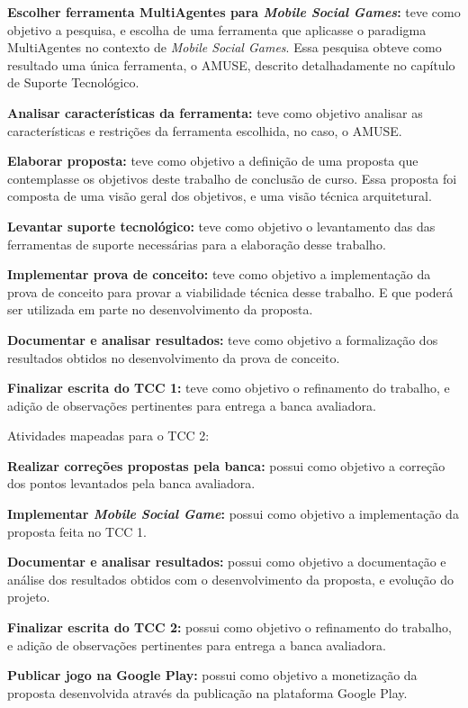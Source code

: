 \textbf{Escolher ferramenta MultiAgentes para \textit{Mobile Social Games}:} teve
como objetivo a pesquisa, e escolha de uma ferramenta que aplicasse o paradigma
MultiAgentes no contexto de \textit{Mobile Social Games}. Essa pesquisa obteve como
resultado uma única ferramenta, o AMUSE, descrito detalhadamente no capítulo de Suporte Tecnológico.

\textbf{Analisar características da ferramenta:} teve como objetivo analisar as
características e restrições da ferramenta escolhida, no caso, o AMUSE.

\textbf{Elaborar proposta:} teve como objetivo a definição de uma proposta que
contemplasse os objetivos deste trabalho de conclusão de curso. Essa proposta foi
composta de uma visão geral dos objetivos, e uma visão técnica arquitetural.

\textbf{Levantar suporte tecnológico:} teve como objetivo o levantamento das
das ferramentas de suporte necessárias para a elaboração desse trabalho.

\textbf{Implementar prova de conceito:} teve como objetivo a implementação da
prova de conceito para provar a viabilidade técnica desse trabalho. E que poderá
ser utilizada em parte no desenvolvimento da proposta.

\textbf{Documentar e analisar resultados:} teve como objetivo a formalização dos
resultados obtidos no desenvolvimento da prova de conceito.

\textbf{Finalizar escrita do TCC 1:} teve como objetivo o refinamento do trabalho,
e adição de observações pertinentes para entrega a banca avaliadora.

Atividades mapeadas para o TCC 2:

\textbf{Realizar correções propostas pela banca:} possui como objetivo a correção
dos pontos levantados pela banca avaliadora.

\textbf{Implementar \textit{Mobile Social Game}:} possui como objetivo a
implementação da proposta feita no TCC 1.

\textbf{Documentar e analisar resultados:} possui como objetivo a documentação e
análise dos resultados obtidos com o desenvolvimento da proposta, e evolução do
projeto.

\textbf{Finalizar escrita do TCC 2:} possui como objetivo o refinamento do trabalho,
e adição de observações pertinentes para entrega a banca avaliadora.

\textbf{Publicar jogo na Google Play:} possui como objetivo a monetização da proposta
desenvolvida através da publicação na plataforma Google Play.


